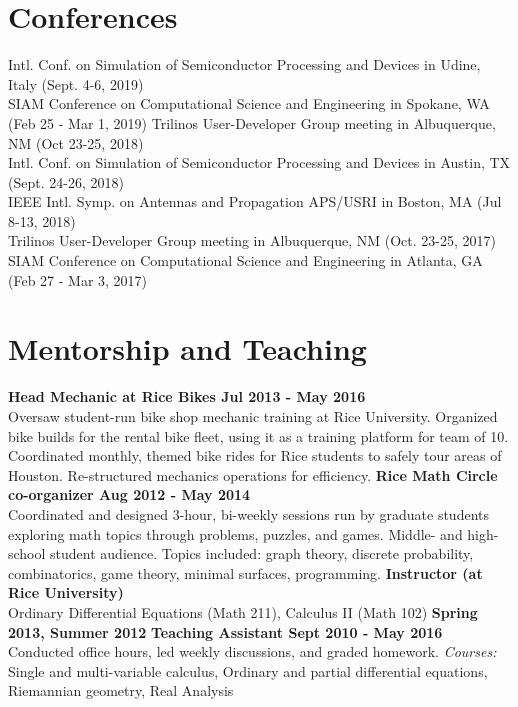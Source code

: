 \documentclass[margin,line]{res}
\begin{document}
\begin{resume}
\section{\sc Conferences}
Intl. Conf. on Simulation of Semiconductor Processing and Devices in Udine, Italy (Sept. 4-6, 2019)\\
SIAM Conference on Computational Science and Engineering in Spokane, WA (Feb 25 - Mar 1, 2019)
Trilinos User-Developer Group meeting in Albuquerque, NM (Oct 23-25, 2018)\\
Intl. Conf. on Simulation of Semiconductor Processing and Devices in Austin, TX (Sept. 24-26, 2018)\\
IEEE Intl. Symp. on Antennas and Propagation APS/USRI in Boston, MA (Jul 8-13, 2018)\\
Trilinos User-Developer Group meeting in Albuquerque, NM (Oct. 23-25, 2017)\\
SIAM Conference on Computational Science and Engineering in Atlanta, GA (Feb 27 - Mar 3, 2017)

\section{\sc Mentorship and Teaching}
{\bf Head Mechanic at Rice Bikes \hfill Jul 2013 - May 2016} \\
Oversaw student-run bike shop mechanic training at Rice University. Organized bike builds for the rental bike fleet, using it as a training platform for team of 10. Coordinated monthly, themed bike rides for Rice students to safely tour areas of Houston. Re-structured mechanics operations for efficiency.
\vskip -5pt
{\bf Rice Math Circle co-organizer \hfill Aug 2012 - May 2014}\\
Coordinated and designed 3-hour, bi-weekly sessions run by graduate students exploring math topics through problems, puzzles, and games. Middle- and high-school student audience. Topics included: graph theory, discrete probability, combinatorics, game theory, minimal surfaces, programming.
\vskip -5pt
{\bf Instructor (at Rice University)} \\
Ordinary Differential Equations (Math 211), Calculus II (Math 102) \hfill {\bf Spring 2013, Summer 2012}
\vskip -5pt
{\bf Teaching Assistant \hfill Sept 2010 - May 2016}\\
Conducted office hours, led weekly discussions, and graded homework. {\em Courses:} Single and multi-variable calculus, Ordinary and partial differential equations, Riemannian geometry, Real Analysis


\end{resume}
\end{document}
